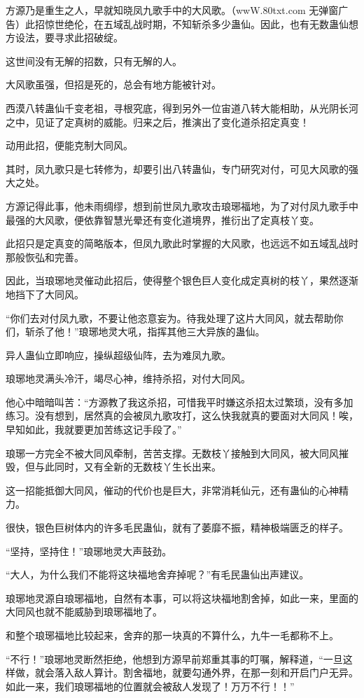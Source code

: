 \begin{this_body}
方源乃是重生之人，早就知晓凤九歌手中的大风歌。（wwW.80txt.com 无弹窗广告）此招惊世绝伦，在五域乱战时期，不知斩杀多少蛊仙。因此，也有无数蛊仙想方设法，要寻求此招破绽。

这世间没有无解的招数，只有无解的人。

大风歌虽强，但招是死的，总会有地方能被针对。

西漠八转蛊仙千变老祖，寻根究底，得到另外一位宙道八转大能相助，从光阴长河之中，见证了定真树的威能。归来之后，推演出了变化道杀招定真变！

动用此招，便能克制大同风。

其时，凤九歌只是七转修为，却要引出八转蛊仙，专门研究对付，可见大风歌的强大之处。

方源记得此事，他未雨绸缪，想到前世凤九歌攻击琅琊福地，为了对付凤九歌手中最强的大风歌，便依靠智慧光晕还有变化道境界，推衍出了定真枝丫变。

此招只是定真变的简略版本，但凤九歌此时掌握的大风歌，也远远不如五域乱战时那般恢弘和完善。

因此，当琅琊地灵催动此招后，使得整个银色巨人变化成定真树的枝丫，果然逐渐地挡下了大同风。

“你们去对付凤九歌，不要让他恣意妄为。待我处理了这片大同风，就去帮助你们，斩杀了他！”琅琊地灵大吼，指挥其他三大异族的蛊仙。

异人蛊仙立即响应，操纵超级仙阵，去为难凤九歌。

琅琊地灵满头冷汗，竭尽心神，维持杀招，对付大同风。

他心中暗暗叫苦：“方源教了我这杀招，可惜我平时嫌这杀招太过繁琐，没有多加练习。没有想到，居然真的会被凤九歌攻打，这么快我就真的要面对大同风！唉，早知如此，我就要更加苦练这记手段了。”

琅琊一方完全不被大同风牵制，苦苦支撑。无数枝丫接触到大同风，被大同风摧毁，但与此同时，又有全新的无数枝丫生长出来。

这一招能抵御大同风，催动的代价也是巨大，非常消耗仙元，还有蛊仙的心神精力。

很快，银色巨树体内的许多毛民蛊仙，就有了萎靡不振，精神极端匮乏的样子。

“坚持，坚持住！”琅琊地灵大声鼓劲。

“大人，为什么我们不能将这块福地舍弃掉呢？”有毛民蛊仙出声建议。

琅琊地灵源自琅琊福地，自然有本事，可以将这块福地割舍掉，如此一来，里面的大同风也就不能威胁到琅琊福地了。

和整个琅琊福地比较起来，舍弃的那一块真的不算什么，九牛一毛都称不上。

“不行！”琅琊地灵断然拒绝，他想到方源早前郑重其事的叮嘱，解释道，“一旦这样做，就会落入敌人算计。割舍福地，就要勾通外界，在那一刻和开启门户无异。如此一来，我们琅琊福地的位置就会被敌人发现了！万万不行！！”


\end{this_body}
